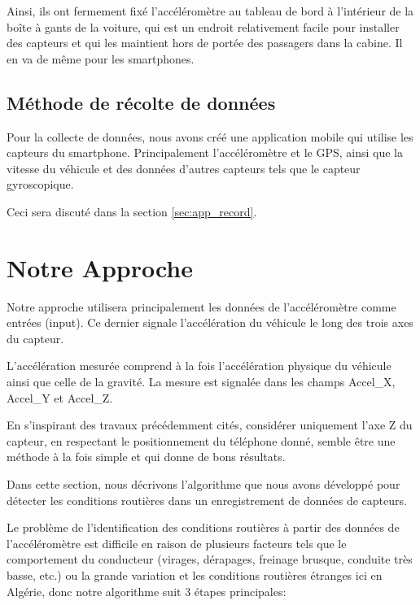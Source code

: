 Ainsi, ils ont fermement fixé l'accéléromètre au tableau de bord à l'intérieur de la boîte à gants de la voiture, qui est un endroit relativement facile pour installer des capteurs et qui les maintient hors de portée des passagers dans la cabine. Il en va de même pour les smartphones.


\subsection{Méthode de récolte de données}
Pour la collecte de données, nous avons créé une application mobile qui utilise les capteurs du smartphone. Principalement l'accéléromètre et le GPS, ainsi que la vitesse du véhicule et des données d'autres capteurs tels que le capteur gyroscopique.

Ceci sera discuté dans la section \ref{sec:app_record}.

\section{Notre Approche}
\label{sec:approache}
Notre approche utilisera principalement les données de l'accéléromètre comme entrées (input).
Ce dernier signale l'accélération du véhicule le long des trois axes du capteur. 

L'accélération mesurée comprend à la fois l'accélération physique du véhicule ainsi que celle de la gravité. La  mesure est signalée dans les champs Accel\_X, Accel\_Y et Accel\_Z. 

En s'inspirant des travaux précédemment cités, considérer uniquement l'axe Z du capteur, en respectant le positionnement du téléphone donné, semble être une méthode à la fois simple et qui donne de bons résultats.

Dans cette section, nous décrivons l'algorithme que nous avons développé pour détecter les conditions routières dans un enregistrement de données de capteurs. 

Le problème de l'identification des conditions routières à partir des données de l'accéléromètre est difficile en raison de plusieurs facteurs tels que le comportement du conducteur (virages, dérapages, freinage brusque, conduite très basse, etc.) ou la grande variation et les conditions routières étranges ici en Algérie, donc notre algorithme suit 3 étapes principales:

